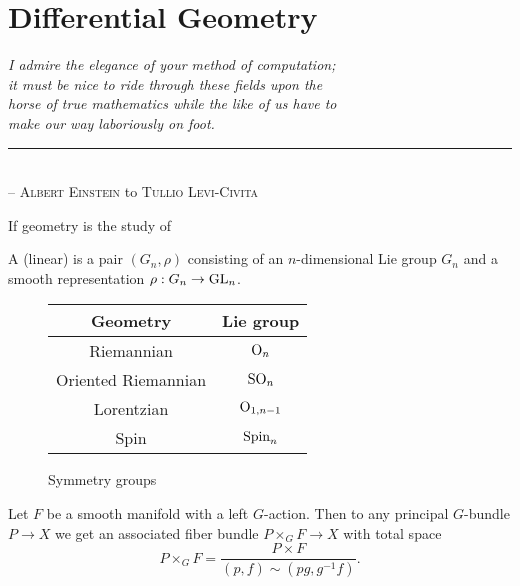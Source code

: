 \chapter{Differential Geometry}

\begin{flushleft}
	\textsl{I admire the elegance of your method of computation;}\\
	\textsl{it must be nice to ride through these fields upon the}\\
  \textsl{horse of true mathematics while the like of us have to}\\
  \textsl{make our way laboriously on foot.}\\
	\rule[0pt]{24em}{0.5pt}\\
	-- \textsc{Albert Einstein} to \textsc{Tullio Levi-Civita}\\
	\vspace{2em}
\end{flushleft}

If geometry is the study of 
\begin{definition}
  A (linear)  is a pair $(G_n,\rho)$ consisting 
  of an $n$-dimensional Lie group $G_n$ and a smooth representation $\rho : G_n \to {\operatorname{GL}}_n$.
\end{definition}

\begin{figure}[ht]
  \centering
  \begin{tabular}{|c|c|}
    \hline
    \textbf{Geometry} & \textbf{Lie group} \\
    \hline
    Riemannian & ${\operatorname{O}}_n$ \\
    Oriented Riemannian & ${\operatorname{SO}}_n$ \\
    Lorentzian & ${\operatorname{O}}_{1,n-1}$ \\
    Spin & ${\operatorname{Spin}}_n$\\
    \hline
  \end{tabular}\vspace{0.5em}
  \caption{Symmetry groups}
\end{figure}


\begin{definition}
  Let $F$ be a smooth manifold with a left $G$-action. Then to any principal $G$-bundle $P \to X$ we get an associated fiber bundle $P\times_G F \to X$ with total space
  \[
    P\times_G F = \frac{P\times F}{(p,f) \sim (pg, g^{-1}f)}.
  \]
\end{definition}

